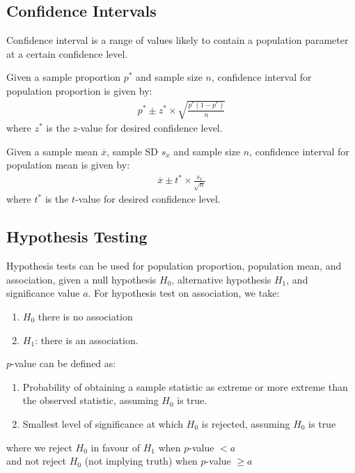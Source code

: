 \documentclass[12pt, a4paper]{article}
\begin{document}
\begin{multicols*}{3}
\subsection{Confidence Intervals}
Confidence interval is a range of values likely to contain a population parameter at a certain confidence level.

Given a sample proportion $p^*$ and sample size $n$, confidence interval for population proportion is given by:
\begin{align*}
  p^* \pm z^* \times \sqrt{\frac{p^*(1-p^*)}{n}}
\end{align*}
where $z^*$ is the $z$-value for desired confidence level.

Given a sample mean $\overline{x}$, sample SD $s_x$ and sample size $n$, confidence interval for population mean is given by:
\begin{align*}
  \overline{x} \pm t^* \times \frac{s_x}{\sqrt{n}}
\end{align*}
where $t^*$ is the $t$-value for desired confidence level.

\subsection{Hypothesis Testing}
Hypothesis tests can be used for population proportion, population mean, and association, given a null hypothesis $H_0$, alternative hypothesis $H_1$, and significance value $a$.
For hypothesis test on association, we take:
\begin{enumerate}[\roman*.]
  \item $H_0$ there is no association
  \item $H_1$: there is an association.  
\end{enumerate}

$p$-value can be defined as:
\begin{enumerate}[\roman*.]
  \item Probability of obtaining a sample statistic as extreme or more extreme than the observed statistic, assuming $H_0$ is true.
  \item Smallest level of significance at which $H_0$ is rejected, assuming $H_0$ is true
\end{enumerate}
where we reject $H_0$ in favour of $H_1$ when $p$-value $< a$\\
and not reject $H_0$ (not implying truth) when $p$-value $\geq a$

\end{multicols*}
\end{document}
